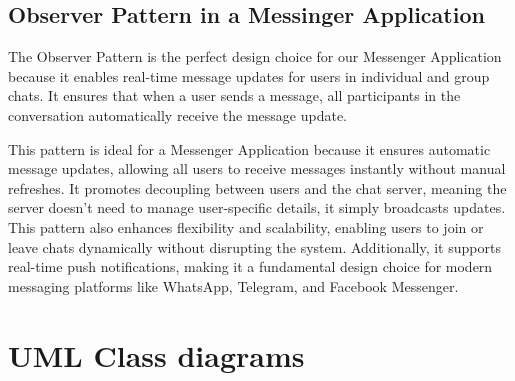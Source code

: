 \section{Observer Pattern in a Messinger Application}

The Observer Pattern is the perfect design choice for our Messenger Application because it enables real-time message updates for users in individual and group chats. It ensures that when a user sends a message, all participants in the conversation automatically receive the message update.


This pattern is ideal for a Messenger Application because it ensures automatic message updates, allowing all users to receive messages instantly without manual refreshes. It promotes decoupling between users and the chat server, meaning the server doesn’t need to manage user-specific details, it simply broadcasts updates. This pattern also enhances flexibility and scalability, enabling users to join or leave chats dynamically without disrupting the system. Additionally, it supports real-time push notifications, making it a fundamental design choice for modern messaging platforms like WhatsApp, Telegram, and Facebook Messenger.

\chapter{UML Class diagrams}
\thispagestyle{pagestyle}

